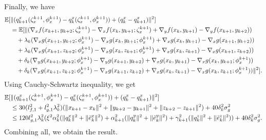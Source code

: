 Finally, we have
\begin{align*}
    \mathbb{E}[&\| (q_{k+1}^x (\zeta_{x}^{k+1}, \phi_{x}^{k+1}) - q_k^x (\zeta_{x}^{k+1}, \phi_{x}^{k+1})) + (q_k^x - q_{k+1}^x)\|^2 ] \\
    &= \mathbb{E}[\| (\nabla_x f(x_{k+1}, y_{k+2}; \zeta_x^{k+1}) - \nabla_x f(x_{k}, y_{k+1}; \zeta_x^{k+1}) + \nabla_y f(x_{k}, y_{k+1}) - \nabla_y f(x_{k+1}, y_{k+2})) \\
    &\quad + \lambda_k (\nabla_x g(x_{k+1}, y_{k+2}; \phi_x^{k+1}) - \nabla_x g(x_k, y_{k+1}; \phi_x^{k+1}) + \nabla_x g(x_k, y_{k+1}) - \nabla_x g(x_{k+1}, y_{k+2})) \\
    &\quad + \lambda_k (\nabla_x g(x_{k+1}, z_{k+2}; \phi_x^{k+1}) - \nabla_x g(x_k, z_{k+1}; \phi_x^{k+1}) + \nabla_x g(x_k, z_{k+1}) - \nabla_x g(x_{k+1}, z_{k+2})) \\
    &\quad + \delta_k (\nabla_y g(x_{k+1},y_{k+2}; \phi_{x}^{k+1}) - \nabla_y g(x_{k+1}, y_{k+2}) + \nabla_x g(x_k,y_{k+1}) - \nabla_x g(x_k, y_{k+1}; \phi_{x}^{k+1}) ) \\
    &\quad + \delta_k (\nabla_x g(x_{k+1},z_{k+2}; \phi_{x}^{k+1}) - \nabla_x g(x_{k+1}, z_{k+2}) + \nabla_x g(x_k,z_{k+1}) - \nabla_x g(x_k, z_{k+1}; \phi_{x}^{k+1}) ) \|^2].
\end{align*}
Using Cauchy-Schwartz inequality, we get
\begin{align*}
    \mathbb{E}[&\| (q_{k+1}^x (\zeta_{x}^{k+1}, \phi_{x}^{k+1}) - q_k^x (\zeta_{x}^{k+1}, \phi_{x}^{k+1})) + (q_k^x - q_{k+1}^x)\|^2 ] \\
    &\le 30(l_{f,1}^2 + l_{g,1}^2 \lambda_k^2) (\|x_{k+1} - x_k\|^2 + \|y_{k+2} - y_{k+1}\|^2 + \|z_{k+2} - z_{k+1}\|^2) + 40 \delta_k^2 \sigma_g^2 \\
    &\le 120 l_{g,1}^2 \lambda_k^2 (\xi^2 \alpha_k^2 (\|q_k^x\|^2 + \|\tilde{e}_k^x\|^2) + \alpha_{k+1}^2 (\|q_k^y\|^2 + \|\tilde{e}_k^y\|^2) + \gamma_{k+1}^2 (\|q_k^z\|^2 + \|\tilde{e}_k^z\|^2)) + 40 \delta_k^2 \sigma_g^2.
\end{align*}
Combining all, we obtain the result. 